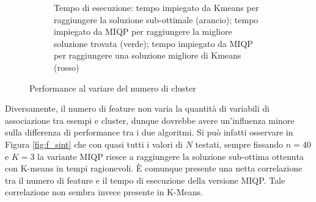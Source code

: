 \documentclass{article}
\begin{document}
\begin{figure}[H]
\begin{subfigure}[t]{0.49\linewidth}
         \caption{Tempo di esecuzione: tempo impiegato da Kmeans per raggiungere la soluzione sub-ottimale (arancio); tempo impiegato da MIQP per raggiungere la migliore soluzione trovata (verde); tempo impiegato da MIQP per raggiungere una soluzione migliore di Kmeans (rosso)}
     \end{subfigure}
        \caption{Performance al variare del numero di cluster}
        \label{fig:k_sint}
     \end{figure}
    Diversamente, il numero di feature non varia la quantità di variabili di associazione tra esempi e cluster, dunque dovrebbe avere un'influenza minore sulla differenza di performance tra i due algoritmi. Si può infatti osservare in Figura \ref{fig:f_sint} che con quasi tutti i valori di $N$ testati, sempre fissando $n=40$ e $K=3$ la variante MIQP riesce a raggiungere la soluzione sub-ottima ottenuta con K-means in tempi ragionevoli. È comunque presente una netta correlazione tra il numero di feature e il tempo di esecuzione della versione MIQP. Tale correlazione non sembra invece presente in K-Means.\\
\end{document}
